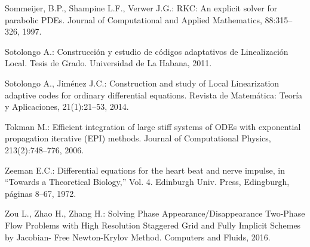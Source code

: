 \begin{thebibliography}{99}
 Sommeijer, B.P., Shampine L.F., Verwer J.G.: RKC: An explicit solver for parabolic PDEs.
Journal of Computational and Applied Mathematics, 88:315–326, 1997.

 Sotolongo A.: Construcción y estudio de códigos adaptativos de Linealización Local. Tesis de
Grado. Universidad de La Habana, 2011.

 Sotolongo A., Jiménez J.C.: Construction and study of Local Linearization adaptive codes
for ordinary differential equations. Revista de Matemática: Teoría y Aplicaciones, 21(1):21–53,
2014.

 Tokman M.: Efficient integration of large stiff systems of ODEs with exponential propagation
iterative (EPI) methods. Journal of Computational Physics, 213(2):748–776, 2006.

 Zeeman E.C.: Differential equations for the heart beat and nerve impulse, in “Towards a Theoretical
Biology,” Vol. 4. Edinburgh Univ. Press, Edingburgh, páginas 8–67, 1972.

 Zou L., Zhao H., Zhang H.: Solving Phase Appearance/Disappearance Two-Phase
Flow Problems with High Resolution Staggered Grid and Fully Implicit Schemes by Jacobian-
Free Newton-Krylov Method. Computers and Fluids, 2016.
	
\end{thebibliography}